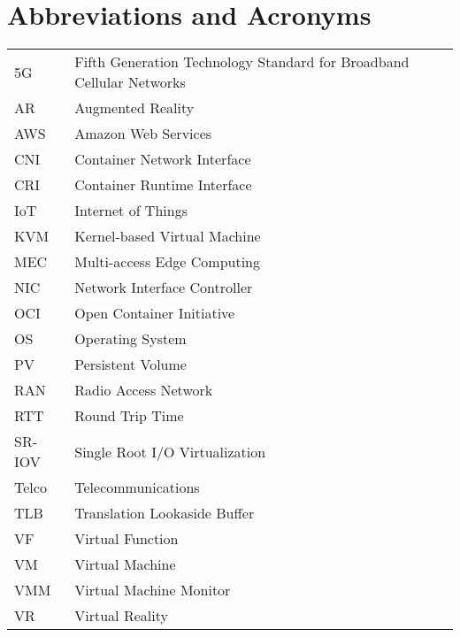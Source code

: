\chapter*{Abbreviations and Acronyms}

\noindent
\begin{longtable}{@{}p{}p{}@{}}
5G & Fifth Generation Technology Standard for Broadband Cellular Networks \\
AR & Augmented Reality \\
AWS & Amazon Web Services \\
CNI & Container Network Interface \\
CRI & Container Runtime Interface \\
IoT & Internet of Things \\
KVM & Kernel-based Virtual Machine \\
MEC & Multi-access Edge Computing \\
NIC & Network Interface Controller \\
OCI & Open Container Initiative \\
OS & Operating System \\
PV & Persistent Volume \\
RAN & Radio Access Network \\
RTT & Round Trip Time \\
SR-IOV & Single Root I/O Virtualization \\
Telco & Telecommunications \\
TLB & Translation Lookaside Buffer \\
VF & Virtual Function \\
VM & Virtual Machine \\
VMM & Virtual Machine Monitor \\
VR & Virtual Reality\\
\end{longtable}
